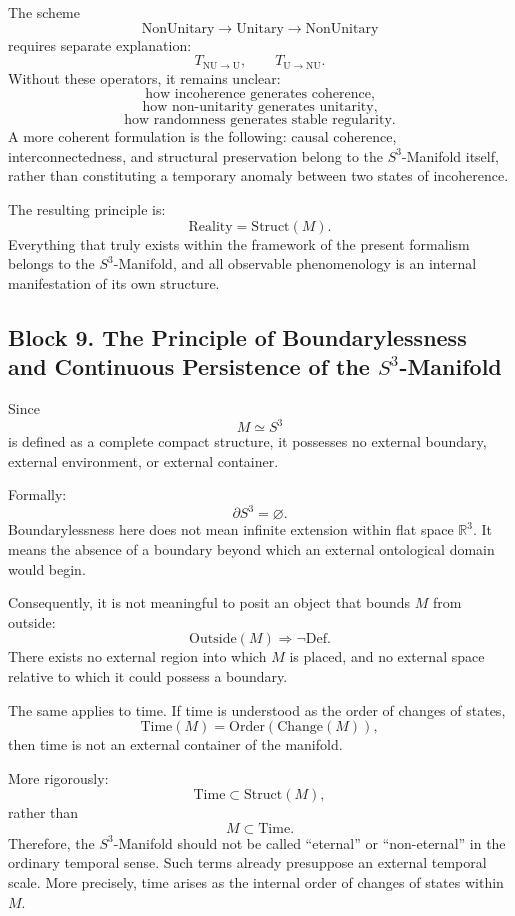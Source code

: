 \documentclass[12pt,a4paper]{article}
\theoremstyle{definition}
\begin{document}
The scheme
\[
\mathrm{NonUnitary}\to \mathrm{Unitary}\to \mathrm{NonUnitary}
\]
requires separate explanation:
\[
T_{\mathrm{NU}\to \mathrm U},
\qquad
T_{\mathrm U\to \mathrm{NU}}.
\]
Without these operators, it remains unclear:
\[
\text{how incoherence generates coherence,}
\]
\[
\text{how non-unitarity generates unitarity,}
\]
\[
\text{how randomness generates stable regularity.}
\]
A more coherent formulation is the following: causal coherence, interconnectedness, and structural preservation belong to the \(S^3\)-Manifold itself, rather than constituting a temporary anomaly between two states of incoherence.

The resulting principle is:
\[
\mathrm{Reality}=\mathrm{Struct}(M).
\]
Everything that truly exists within the framework of the present formalism belongs to the \(S^3\)-Manifold, and all observable phenomenology is an internal manifestation of its own structure.



\subsection{Block 9. The Principle of Boundarylessness and Continuous Persistence of the \(S^3\)-Manifold}
Since
\[
M\simeq S^3
\]
is defined as a complete compact structure, it possesses no external boundary, external environment, or external container.

Formally:
\[
\partial S^3=\varnothing.
\]
Boundarylessness here does not mean infinite extension within flat space \(\mathbb R^3\). It means the absence of a boundary beyond which an external ontological domain would begin.

Consequently, it is not meaningful to posit an object that bounds \(M\) from outside:
\[
\mathrm{Outside}(M)\Rightarrow \neg \mathrm{Def}.
\]
There exists no external region into which \(M\) is placed, and no external space relative to which it could possess a boundary.

The same applies to time. If time is understood as the order of changes of states,
\[
\mathrm{Time}(M)=\mathrm{Order}(\mathrm{Change}(M)),
\]
then time is not an external container of the manifold.

More rigorously:
\[
\mathrm{Time}\subset \mathrm{Struct}(M),
\]
rather than
\[
M\subset \mathrm{Time}.
\]
Therefore, the \(S^3\)-Manifold should not be called ``eternal'' or ``non-eternal'' in the ordinary temporal sense. Such terms already presuppose an external temporal scale. More precisely, time arises as the internal order of changes of states within \(M\).
\end{document}
